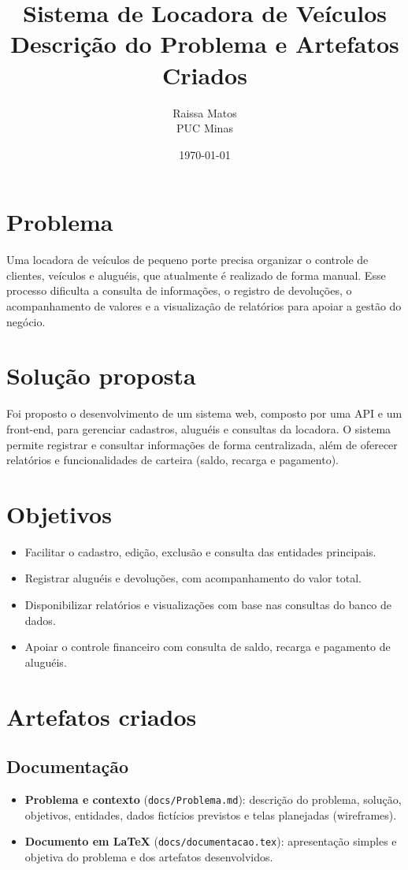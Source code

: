 \documentclass[12pt,a4paper]{article}
\title{Sistema de Locadora de Veículos\\
\large Descrição do Problema e Artefatos Criados}
\author{Raissa Matos\\PUC Minas}
\date{\today}
\begin{document}
\maketitle

\section{Problema}
Uma locadora de veículos de pequeno porte precisa organizar o controle de clientes, veículos e aluguéis, que atualmente é realizado de forma manual. Esse processo dificulta a consulta de informações, o registro de devoluções, o acompanhamento de valores e a visualização de relatórios para apoiar a gestão do negócio.

\section{Solução proposta}
Foi proposto o desenvolvimento de um sistema web, composto por uma API e um front-end, para gerenciar cadastros, aluguéis e consultas da locadora. O sistema permite registrar e consultar informações de forma centralizada, além de oferecer relatórios e funcionalidades de carteira (saldo, recarga e pagamento).

\section{Objetivos}
\begin{itemize}[leftmargin=*]
    \item Facilitar o cadastro, edição, exclusão e consulta das entidades principais.
    \item Registrar aluguéis e devoluções, com acompanhamento do valor total.
    \item Disponibilizar relatórios e visualizações com base nas consultas do banco de dados.
    \item Apoiar o controle financeiro com consulta de saldo, recarga e pagamento de aluguéis.
\end{itemize}

\section{Artefatos criados}

\subsection{Documentação}
\begin{itemize}[leftmargin=*]
    \item \textbf{Problema e contexto} (\texttt{docs/Problema.md}): descrição do problema, solução, objetivos, entidades, dados fictícios previstos e telas planejadas (wireframes).
    \item \textbf{Documento em LaTeX} (\texttt{docs/documentacao.tex}): apresentação simples e objetiva do problema e dos artefatos desenvolvidos.
\end{itemize}
\end{document}
